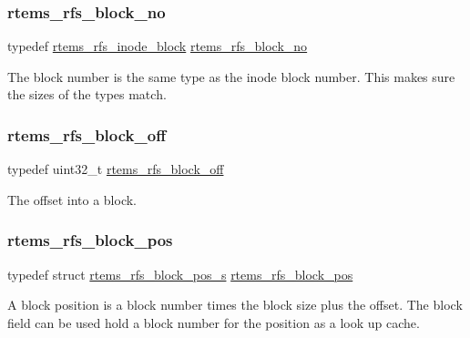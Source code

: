 \subsubsection{\texorpdfstring{rtems\_rfs\_block\_no}{rtems\_rfs\_block\_no}}
{\footnotesize\ttfamily typedef \mbox{\hyperlink{rtems-rfs-inode_8h_aa30717f37e5238a8f6387b4d0dbb2ae3}{rtems\+\_\+rfs\+\_\+inode\+\_\+block}} \mbox{\hyperlink{rtems-rfs-block-pos_8h_abbf8bb95acf9bd16ed3291f7da518e9a}{rtems\+\_\+rfs\+\_\+block\+\_\+no}}}

The block number is the same type as the inode block number. This makes sure the sizes of the types match. \mbox{\label{rtems-rfs-block-pos_8h_ad32ba1f9be3b667fe3e778d0edfdfff3}} 
\subsubsection{\texorpdfstring{rtems\_rfs\_block\_off}{rtems\_rfs\_block\_off}}
{\footnotesize\ttfamily typedef uint32\+\_\+t \mbox{\hyperlink{rtems-rfs-block-pos_8h_ad32ba1f9be3b667fe3e778d0edfdfff3}{rtems\+\_\+rfs\+\_\+block\+\_\+off}}}

The offset into a block. \mbox{\label{rtems-rfs-block-pos_8h_a0d8bd7482333e584a03df45e60cda226}} 
\subsubsection{\texorpdfstring{rtems\_rfs\_block\_pos}{rtems\_rfs\_block\_pos}}
{\footnotesize\ttfamily typedef struct \mbox{\hyperlink{structrtems__rfs__block__pos__s}{rtems\+\_\+rfs\+\_\+block\+\_\+pos\+\_\+s}}  \mbox{\hyperlink{rtems-rfs-block-pos_8h_a0d8bd7482333e584a03df45e60cda226}{rtems\+\_\+rfs\+\_\+block\+\_\+pos}}}

A block position is a block number times the block size plus the offset. The block field can be used hold a block number for the position as a look up cache. \mbox{\label{rtems-rfs-block-pos_8h_aa72438eee22908110dc633ca6b89b390}} 
